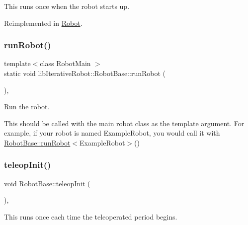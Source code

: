 This runs once when the robot starts up. 

Reimplemented in \mbox{\hyperlink{class_robot_a0ade19d412e58249d9f7a138d306130c}{Robot}}.

\mbox{\label{classlib_iterative_robot_1_1_robot_base_a5a57c611cc6c2444e1c8d2fd514bd25c}} 
\subsubsection{\texorpdfstring{runRobot()}{runRobot()}}
{\footnotesize\ttfamily template$<$class Robot\+Main $>$ \\
static void lib\+Iterative\+Robot\+::\+Robot\+Base\+::run\+Robot (\begin{DoxyParamCaption}{ }\end{DoxyParamCaption})\hspace{0.3cm}{\ttfamily [inline]}, {\ttfamily [static]}}

Run the robot.

This should be called with the main robot class as the template argument. For example, if your robot is named {\ttfamily Example\+Robot}, you would call it with {\ttfamily \mbox{\hyperlink{classlib_iterative_robot_1_1_robot_base_a5a57c611cc6c2444e1c8d2fd514bd25c}{Robot\+Base\+::run\+Robot}}$<$Example\+Robot$>$()} \mbox{\label{classlib_iterative_robot_1_1_robot_base_a290bea17acf9bc884a490472e9d2e039}} 
\subsubsection{\texorpdfstring{teleopInit()}{teleopInit()}}
{\footnotesize\ttfamily void Robot\+Base\+::teleop\+Init (\begin{DoxyParamCaption}{ }\end{DoxyParamCaption})\hspace{0.3cm}{\ttfamily [protected]}, {\ttfamily [virtual]}}

This runs once each time the teleoperated period begins. 


